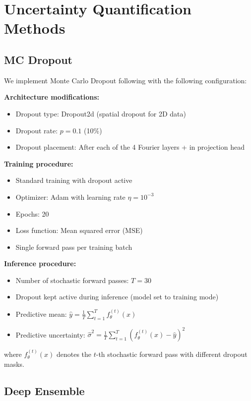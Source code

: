 \section{Uncertainty Quantification Methods}

\subsection{MC Dropout}

We implement Monte Carlo Dropout following \cite{gal2016dropout} with the following configuration:

\textbf{Architecture modifications:}
\begin{itemize}
\item Dropout type: Dropout2d (spatial dropout \cite{tompson2015efficient} for 2D data)
\item Dropout rate: $p = 0.1$ (10\%)
\item Dropout placement: After each of the 4 Fourier layers + in projection head
\end{itemize}

\textbf{Training procedure:}
\begin{itemize}
\item Standard training with dropout active
\item Optimizer: Adam \cite{kingma2014adam} with learning rate $\eta = 10^{-3}$
\item Epochs: 20
\item Loss function: Mean squared error (MSE)
\item Single forward pass per training batch
\end{itemize}

\textbf{Inference procedure:}
\begin{itemize}
\item Number of stochastic forward passes: $T = 30$
\item Dropout kept active during inference (model set to training mode)
\item Predictive mean: $\hat{y} = \frac{1}{T}\sum_{t=1}^{T} f_\theta^{(t)}(x)$
\item Predictive uncertainty: $\hat{\sigma}^2 = \frac{1}{T}\sum_{t=1}^{T} (f_\theta^{(t)}(x) - \hat{y})^2$
\end{itemize}

where $f_\theta^{(t)}(x)$ denotes the $t$-th stochastic forward pass with different dropout masks.

\subsection{Deep Ensemble}

